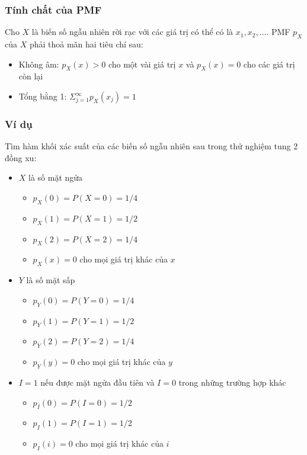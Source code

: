 \documentclass[
]{book}
\providecommand{\tightlist}{%
  \setlength{\itemsep}{0pt}\setlength{\parskip}{0pt}}
\begin{document}
\hypertarget{tuxednh-chux1ea5t-cux1ee7a-pmf}{%
\subsubsection{Tính chất của PMF}\label{tuxednh-chux1ea5t-cux1ee7a-pmf}}

Cho \(X\) là biến số ngẫu nhiên rời rạc với các giá trị có thể có là \(x_1, x_2, \ldots\). PMF \(p_X\) của \(X\) phải thoả mãn hai tiêu chí sau:

\begin{itemize}
\tightlist
\item
  Không âm: \(p_X(x) > 0\) cho một vài giá trị \(x\) và \(p_X(x) = 0\) cho các giá trị còn lại
\item
  Tổng bằng 1: \(\Sigma^\infty_{j = 1}p_X(x_j) = 1\)
\end{itemize}

\hypertarget{vuxed-dux1ee5-1}{%
\subsubsection{Ví dụ}\label{vuxed-dux1ee5-1}}

Tìm hàm khối xác suất của các biến số ngẫu nhiên sau trong thử nghiệm tung 2 đồng xu:

\begin{itemize}
\tightlist
\item
  \(X\) là số mặt ngửa

  \begin{itemize}
  \tightlist
  \item
    \(p_X(0) = P(X = 0) = 1/4\)
  \item
    \(p_X(1) = P(X = 1) = 1/2\)
  \item
    \(p_X(2) = P(X = 2) = 1/4\)
  \item
    \(p_X(x) = 0\) cho mọi giá trị khác của \(x\)
  \end{itemize}
\item
  \(Y\) là số mặt sấp

  \begin{itemize}
  \tightlist
  \item
    \(p_Y(0) = P(Y = 0) = 1/4\)
  \item
    \(p_Y(1) = P(Y = 1) = 1/2\)
  \item
    \(p_Y(2) = P(Y = 2) = 1/4\)
  \item
    \(p_Y(y) = 0\) cho mọi giá trị khác của \(y\)
  \end{itemize}
\item
  \(I = 1\) nếu được mặt ngửa đầu tiên và \(I = 0\) trong những trường hợp khác

  \begin{itemize}
  \tightlist
  \item
    \(p_I(0) = P(I = 0) = 1/2\)
  \item
    \(p_I(1) = P(I = 1) = 1/2\)
  \item
    \(p_I(i) = 0\) cho mọi giá trị khác của \(i\)
  \end{itemize}
\end{itemize}
\end{document}

